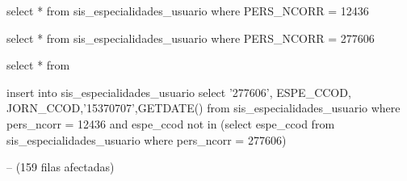 select * from sis_especialidades_usuario where PERS_NCORR = 12436   

select * from sis_especialidades_usuario where PERS_NCORR = 277606     



select * from 

insert into sis_especialidades_usuario 
select '277606', ESPE_CCOD, JORN_CCOD,'15370707',GETDATE() 
  from   sis_especialidades_usuario 
  where  pers_ncorr = 12436 
	and espe_ccod not in (select espe_ccod 
                            from   sis_especialidades_usuario 
                               where  pers_ncorr = 277606)                                
                          
-- (159 filas afectadas)   				  